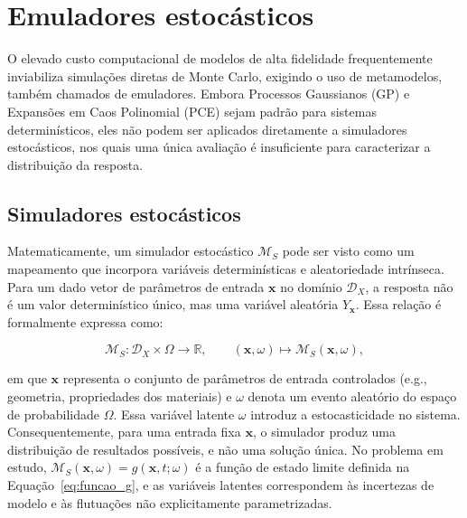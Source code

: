 \section{Emuladores estoc\'asticos}\label{sec:emuladores}


O elevado custo computacional de modelos de alta fidelidade frequentemente inviabiliza simulações diretas de Monte Carlo, exigindo o uso de metamodelos, também chamados de emuladores. Embora Processos Gaussianos (GP) \parencite{rasmussen2006} e Expansões em Caos Polinomial (PCE) \parencite{xiu2002} sejam padrão para sistemas determinísticos, eles não podem ser aplicados diretamente a simuladores estocásticos, nos quais uma única avaliação é insuficiente para caracterizar a distribuição da resposta.

\subsection{Simuladores estoc\'asticos}
\label{subsec:simulador}

Matematicamente, um simulador estocástico $\mathcal{M}_S$ pode ser visto como um mapeamento que incorpora variáveis determinísticas e aleatoriedade intrínseca. Para um dado vetor de parâmetros de entrada $\mathbf{x}$ no domínio $\mathcal{D}_X$, a resposta não é um valor determinístico único, mas uma variável aleatória $Y_{\mathbf{x}}$. Essa relação é formalmente expressa como:

\begin{equation}
\mathcal{M}_S : \mathcal{D}_X \times \Omega \rightarrow \mathbb{R}, \qquad (\mathbf{x}, \omega) \mapsto \mathcal{M}_S(\mathbf{x}, \omega),
\label{eq:simulador_estocastico}
\end{equation}

\noindent em que $\mathbf{x}$ representa o conjunto de parâmetros de entrada controlados (e.g., geometria, propriedades dos materiais) e $\omega$ denota um evento aleatório do espaço de probabilidade $\Omega$. Essa variável latente $\omega$ introduz a estocasticidade no sistema. Consequentemente, para uma entrada fixa $\mathbf{x}$, o simulador produz uma distribuição de resultados possíveis, e não uma solução única. No problema em estudo, $\mathcal{M}_S(\mathbf{x}, \omega) = g(\mathbf{x}, t; \omega)$ é a função de estado limite definida na Equação~\eqref{eq:funcao_g}, e as variáveis latentes correspondem às incertezas de modelo e às flutuações não explicitamente parametrizadas.

